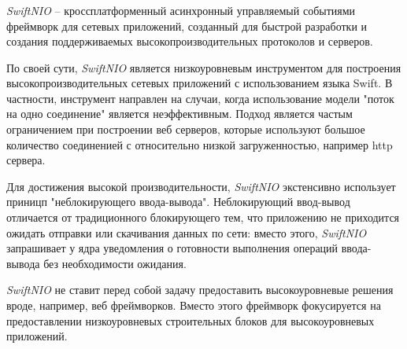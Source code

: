 \subsubsection{}
\label{sec:development:arch:pp:nio}

\textit{SwiftNIO} -- кроссплатформенный асинхронный управляемый событиями фреймворк для сетевых приложений, созданный для быстрой разработки и создания поддерживаемых высокопроизводительных протоколов и серверов\cite{nio:github}.

По своей сути, \textit{SwiftNIO} является низкоуровневым инструментом для построения высокопроизводительных сетевых приложений с использованием языка Swift. В частности, инструмент направлен на случаи, когда использование модели "поток на одно соединение"  является неэффективным. Подход является частым ограничением при построении веб серверов, которые используют большое количество соединенией с относительно низкой загруженностью, например \gls{http} сервера.

Для достижения высокой производительности, \textit{SwiftNIO} экстенсивно использует приницп "неблокирующего ввода-вывода". Неблокирующий ввод-вывод отличается от традиционного блокирующего тем, что приложению не приходится ожидать отправки или скачивания данных по сети: вместо этого, \textit{SwiftNIO} запрашивает у ядра уведомления о готовности выполнения операций ввода-вывода без необходимости ожидания.

\textit{SwiftNIO} не ставит перед собой задачу предоставить высокоуровневые решения вроде, например, веб фреймворков. Вместо этого фреймворк фокусируется на предоставлении низкоуровневых строительных блоков для высокоуровневых приложений.